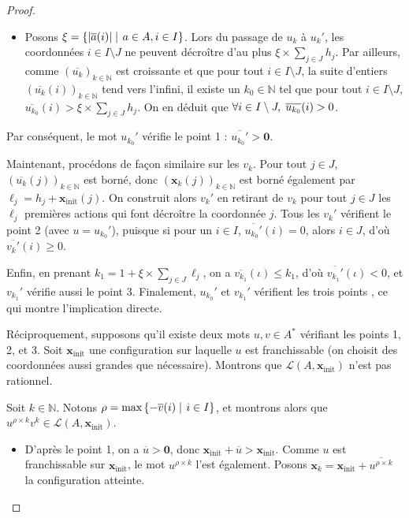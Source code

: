 \documentclass[a4paper,final]{article}
\theoremstyle{definition}
\let\leq\leqslant
\let\geq\geqslant
\newcommand{\set}[2]{\left\{#1\mathrel{\left|\vphantom{#1}\vphantom{#2}\right.}#2\right\}}
\newcommand{\abs}[1]{\ensuremath{\displaystyle\left\lvert #1 \right\rvert}}
\newcommand{\N}{\ensuremath{\mathbb{N}}}
\newcommand{\lang}{\ensuremath{\mathcal{L}}}
\newcommand{\vect}[1]{\ensuremath{\mathbf{#1}}}
\newcommand{\xinit}{\ensuremath{\vect{x}_\text{init}}}
\newcommand{\valeur}[1]{\ensuremath{\overline{#1}}}
\begin{document}
\begin{proof}
\begin{itemize}
    \item Posons $\xi = \set{\abs{\valeur{a}(i)}} {a\in A,i\in I}$.
    Lors du passage de $u_k$ à $u_k'$, les coordonnées $i\in I\setminus J$ ne peuvent décroître d'au plus $\xi \times \sum_{j\in J} h_j$.
    Par ailleurs, comme $(\valeur{u_k})_{k\in\N}$ est croissante et que pour tout $i\in I\setminus J$, la suite d'entiers $(\valeur{u_k}(i))_{k\in\N}$ tend vers l'infini, 
    il existe un $k_0\in\N$ tel que pour tout $i\in I\setminus J$, $\valeur{u_{k_0}}(i) > \xi \times \sum_{j\in J} h_j$.
    On en déduit que $\forall i\in I\setminus J, \hspace{1mm} \valeur{u_{k_0}}(i) > 0$.
\end{itemize}
Par conséquent, le mot $u_{k_0}'$ vérifie le point 1 %
: $\valeur{u_{k_0}'} > \vect{0}$.
\vspace{2mm}

Maintenant, procédons de façon similaire sur les $v_k$.
Pour tout $j\in J$, $(\valeur{u_k}(j))_{k\in\N}$ est borné, donc $(\vect{x}_k(j))_{k\in\N}$ est borné également par $\ell_j = h_j + \xinit(j)$.
On construit alors $v_k'$ en retirant de $v_k$ pour tout $j\in J$ les $\ell_j$ premières actions qui font décroître la coordonnée $j$.
Tous les $v_k'$ vérifient le point 2 (avec $u = u_{k_0}'$), puisque si pour un $i\in I$, $\valeur{u_{k_0}'}(i) = 0$, alors $i\in J$, d'où $\valeur{v_k'}(i) \geq 0$.

Enfin, en prenant $k_1 = 1 + \xi \times \sum_{j\in J} \ell_j$, on a $\valeur{v_{k_1}}(\iota) \leq k_1$, d'où $\valeur{v_{k_1}'}(\iota) < 0$, et $v_{k_1}'$ vérifie aussi le point 3.
Finalement, $u_{k_0}'$ et $v_{k_1}'$ vérifient les trois points %
, ce qui montre l'implication directe.
\vspace{5mm}

Réciproquement, supposons qu'il existe deux mots $u,v\in A^*$ vérifiant les points 1, 2, et 3.
Soit $\xinit$ une configuration sur laquelle $u$ est franchissable (on choisit des coordonnées aussi grandes que nécessaire).
Montrons que $\lang(A,\xinit)$ n'est pas rationnel.

Soit $k\in\N$.
Notons $\rho = \text{max}\set{-\valeur{v}(i)}{i\in I}$, 
et montrons alors que $u^{\rho\times k} v^k \in \lang(A,\xinit)$.

\begin{itemize}
    \item D'après le point 1, on a $\valeur{u} > \vect{0}$, donc $\xinit + \valeur{u} > \xinit$.
    Comme $u$ est franchissable sur $\xinit$, le mot $u^{\rho\times k}$ l'est également.
    Posons $\vect{x}_k = \xinit + \valeur{u^{\rho\times k}}$ la configuration atteinte.
    

\end{itemize}
\end{proof}
\end{document}
